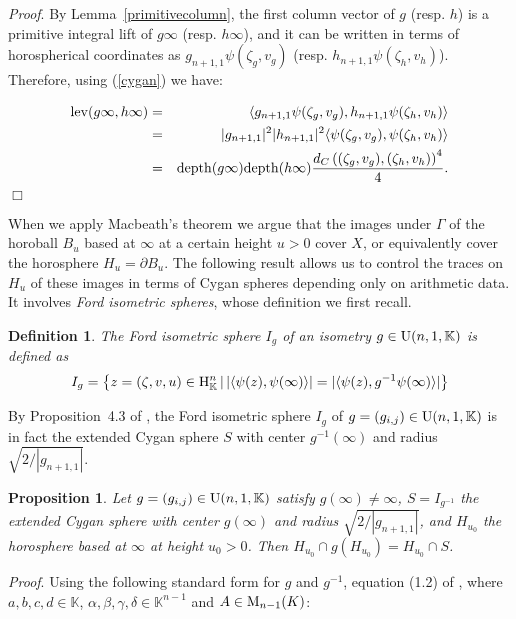 \documentclass{article}[12pt]
\newcommand{\K}{\mathbb{K}}
\newcommand{\la}{\langle}
\newcommand{\ra}{\rangle}
\newtheorem{prop}{Proposition}%
\newtheorem{dfn}{Definition}%
\newcommand{\Pf}{{\em Proof}. }
\newcommand{\EPf}{\hfill$\Box$\vspace{.5cm}}
\begin{document}
\Pf By Lemma~\ref{primitivecolumn}, the first column vector of $g$ (resp. $h$) is a primitive integral lift of $g\infty$ (resp. $h\infty$), and it can be written in terms of horospherical coordinates as $g_{n+1,1}\psi(\zeta_g,v_g)$ (resp. $h_{n+1,1}\psi(\zeta_h,v_h)$). Therefore, using (\ref{cygan}) we have:

\begin{eqnarray*} {\rm lev}(g\infty,h\infty) & = & \la g_{n+1,1}\psi(\zeta_g,v_g),h_{n+1,1}\psi(\zeta_h,v_h) \ra \\
& = & |g_{n+1,1}|^2 |h_{n+1,1}|^2\la\psi(\zeta_g,v_g),\psi(\zeta_h,v_h) \ra \\
& = & {\rm depth} (g\infty) {\rm depth} (h\infty) \frac{d_C \left(  (\zeta_g,v_g),(\zeta_h,v_h)  \right)^4}{4}. 
\end{eqnarray*} \EPf

When we apply Macbeath's theorem we argue that the images under $\Gamma$ of the horoball $B_u$ based at $\infty$ at a certain height $u>0$ cover $X$, or equivalently cover the horosphere $H_u=\partial B_u$.
The following result allows us to control the traces on $H_u$ of these images in terms of Cygan spheres depending only on arithmetic data. It involves \emph{Ford isometric spheres}, whose definition we first recall.

\begin{dfn}\label{isometricsphere}  The \emph{Ford isometric sphere} $I_g$ of an isometry $g \in {\rm U}(n,1,\K)$ is defined as 
$$I_g=\left\{ z=(\zeta,v,u) \in {\rm H}^n_\K \, | \, |\langle \psi (z),\psi (\infty)\rangle| =| \langle \psi (z),g^{-1}\psi (\infty)\rangle| \right\}$$
\end{dfn}  

By Proposition~4.3 of \cite{KP}, the Ford isometric sphere $I_g$ of $g=(g_{i,j}) \in {\rm U}(n,1,\K)$ is in fact the extended Cygan sphere $S$ with center $g^{-1}(\infty)$ and radius $\sqrt{2/|g_{n+1,1}|}$.

\begin{prop}\label{depthradius} Let $g=(g_{i,j}) \in {\rm U}(n,1,\K)$ satisfy $g(\infty)\neq \infty$, $S=I_{g^{-1}}$ the extended Cygan sphere with center $g(\infty)$ and radius $\sqrt{2/|g_{n+1,1}|}$, and $H_{u_0}$ the horosphere based at $\infty$ at height $u_0>0$. Then $H_{u_0} \cap g(H_{u_0})=H_{u_0} \cap S$.
\end{prop}

\Pf Using the following standard form for $g$ and $g^{-1}$, equation (1.2) of \cite{KP}, where $a,b,c,d \in \K$, $\alpha,\beta,\gamma,\delta \in \K^{n-1}$ and $A \in {\rm M}_{n-1}(K)$:
\end{document}
